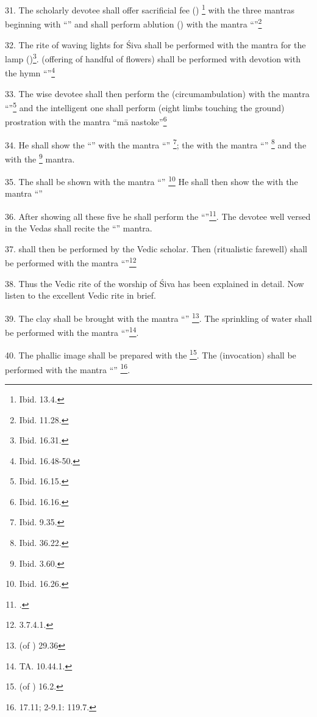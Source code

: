 31. The scholarly devotee shall offer sacrificial fee ()
\footnote{Ibid. 13.4.} with the three mantras beginning with “” \etc and shall perform ablution () with the mantra
“”\footnote{Ibid. 11.28.} \etc

32. The rite of waving lights  for Śiva shall be performed with
the mantra for the lamp ()\footnote{Ibid. 16.31.}.
 (offering of handful of flowers) shall be performed with
devotion with the hymn “”\footnote{Ibid. 16.48-50.} \etc

33. The wise devotee shall then perform the  (circumambulation)
with the mantra “”\footnote{Ibid. 16.15.} and the intelligent
one shall perform  (eight limbs touching the ground) prostration
with the mantra “mā nastoke”\footnote{Ibid. 16.16.} \etc

34. He shall show the “” with the mantra “”
\footnote{Ibid. 9.35.}; the  with the mantra “”
\footnote{Ibid. 36.22.} \etc and the  with the 
\footnote{Ibid. 3.60.} mantra.

35. The  shall be shown with the mantra “”
\footnote{Ibid. 16.26.} \etc He shall then show the  with
the mantra “” \etc

36. After showing all these five  he shall perform
the “”\footnote{.}. The devotee well
versed in the Vedas shall recite the “” mantra.

37.  shall then be performed by the Vedic scholar. Then
 (ritualistic farewell) shall be performed with the mantra
“”\footnote{ 3.7.4.1.} \etc

38. Thus the Vedic rite of the worship of Śiva has been explained in detail. Now
listen to the excellent Vedic rite in brief.

39. The clay shall be brought with the mantra “”
\footnote{ (of ) 29.36}. The sprinkling
of water shall be performed with the mantra “”\footnote{TA. 10.44.1.}.

40. The phallic image shall be prepared with the \footnote{
 (of ) 16.2.}. The 
(invocation) shall be performed with the mantra “”
\footnote{ 17.11;  2-9.1: 119.7.}.

